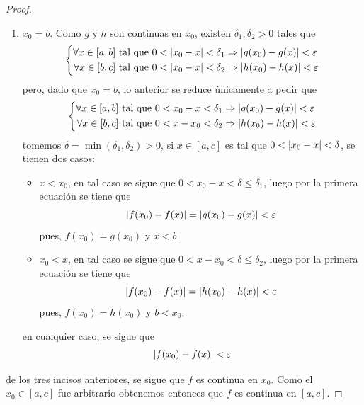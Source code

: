 \documentclass[12pt]{article}
\begin{document}
\begin{enumerate}
\begin{proof}
\begin{enumerate}
            \item $x_0=b$. Como $g$ y $h$ son continuas en $x_0$, existen $\delta_1,\delta_2>0$ tales que
            \begin{equation*}
                \left\{
                    \begin{split}
                        \forall x\in[a,b]\textup{ tal que }0<\left| x_0-x \right|<\delta_1&\Rightarrow \left| g(x_0)-g(x) \right|<\varepsilon\\
                        \forall x\in[b,c]\textup{ tal que }0<\left| x_0-x \right|<\delta_2&\Rightarrow \left| h(x_0)-h(x) \right|<\varepsilon\\
                    \end{split}
                \right.
            \end{equation*}
            pero, dado que $x_0=b$, lo anterior se reduce únicamente a pedir que
            \begin{equation*}
                \left\{
                    \begin{split}
                        \forall x\in[a,b]\textup{ tal que }0<x_0-x<\delta_1&\Rightarrow \left| g(x_0)-g(x) \right|<\varepsilon\\
                        \forall x\in[b,c]\textup{ tal que }0<x-x_0<\delta_2&\Rightarrow \left| h(x_0)-h(x) \right|<\varepsilon\\
                    \end{split}
                \right.
            \end{equation*}
            tomemos $\delta=\min\left(\delta_1,\delta_2\right)>0$, si $x\in[a,c]$ es tal que $0<\left| x_0-x \right|<\delta$, se tienen dos casos:
            \begin{itemize}
                \item $x<x_0$, en tal caso se sigue que $0<x_0-x<\delta\leq\delta_1$, luego por la primera ecuación se tiene que
                \begin{equation*}
                    \left| f(x_0)-f(x) \right|=\left| g(x_0)-g(x) \right|<\varepsilon
                \end{equation*}
                pues, $f(x_0)=g(x_0)$ y $x<b$.
                \item $x_0<x$, en tal caso se sigue que $0<x-x_0<\delta\leq\delta_2$, luego por la primera ecuación se tiene que
                \begin{equation*}
                    \left| f(x_0)-f(x) \right|=\left| h(x_0)-h(x) \right|<\varepsilon
                \end{equation*}
                pues, $f(x_0)=h(x_0)$ y $b<x_0$.
            \end{itemize}
            en cualquier caso, se sigue que
            \begin{equation*}
                \left| f(x_0)-f(x) \right|<\varepsilon
            \end{equation*}
        \end{enumerate}
        de los tres incisos anteriores, se sigue que $f$ es continua en $x_0$. Como el $x_0\in[a,c]$ fue arbitrario obtenemos entonces que $f$ es continua en $[a,c]$.
    \end{proof}


\end{enumerate}
\end{document}
